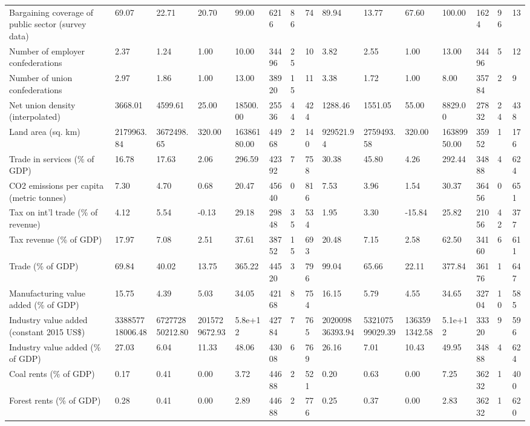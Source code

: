 \begin{longtable}{lllllllllllllll}
\addlinespace
Bargaining coverage of public sector (survey data) & 69.07 & 22.71 & 20.70 & 99.00 & 6216 & 86 & 74 & 89.94 & 13.77 & 67.60 & 100.00 & 1624 & 96 & 13\\
Number of employer confederations & 2.37 & 1.24 & 1.00 & 10.00 & 34496 & 25 & 10 & 3.82 & 2.55 & 1.00 & 13.00 & 34496 & 5 & 12\\
Number of union confederations & 2.97 & 1.86 & 1.00 & 13.00 & 38920 & 15 & 11 & 3.38 & 1.72 & 1.00 & 8.00 & 35784 & 2 & 9\\
Net union density (interpolated) & 3668.01 & 4599.61 & 25.00 & 18500.00 & 25536 & 44 & 424 & 1288.46 & 1551.05 & 55.00 & 8829.00 & 27832 & 24 & 438\\
Land area (sq. km) & 2179963.84 & 3672498.65 & 320.00 & 16386180.00 & 44968 & 2 & 140 & 929521.94 & 2759493.58 & 320.00 & 16389950.00 & 35952 & 1 & 176\\
\addlinespace
Trade in services (\% of GDP) & 16.78 & 17.63 & 2.06 & 296.59 & 42392 & 7 & 758 & 30.38 & 45.80 & 4.26 & 292.44 & 34888 & 4 & 624\\
CO2 emissions per capita (metric tonnes) & 7.30 & 4.70 & 0.68 & 20.47 & 45640 & 0 & 816 & 7.53 & 3.96 & 1.54 & 30.37 & 36456 & 0 & 651\\
Tax on int'l trade (\% of revenue) & 4.12 & 5.54 & -0.13 & 29.18 & 29848 & 35 & 534 & 1.95 & 3.30 & -15.84 & 25.82 & 21056 & 42 & 377\\
Tax revenue (\% of GDP) & 17.97 & 7.08 & 2.51 & 37.61 & 38752 & 15 & 693 & 20.48 & 7.15 & 2.58 & 62.50 & 34160 & 6 & 611\\
Trade (\% of GDP) & 69.84 & 40.02 & 13.75 & 365.22 & 44520 & 3 & 796 & 99.04 & 65.66 & 22.11 & 377.84 & 36176 & 1 & 647\\
\addlinespace
Manufacturing value added (\% of GDP) & 15.75 & 4.39 & 5.03 & 34.05 & 42168 & 8 & 754 & 16.15 & 5.79 & 4.55 & 34.65 & 32704 & 10 & 585\\
Industry value added (constant 2015 US\$) & 338857718006.48 & 672772850212.80 & 2015729672.93 & 5.8e+12 & 42784 & 7 & 765 & 202009836393.94 & 532107599029.39 & 1363591342.58 & 5.1e+12 & 33320 & 9 & 596\\
Industry value added (\% of GDP) & 27.03 & 6.04 & 11.33 & 48.06 & 43008 & 6 & 769 & 26.16 & 7.01 & 10.43 & 49.95 & 34888 & 4 & 624\\
Coal rents (\% of GDP) & 0.17 & 0.41 & 0.00 & 3.72 & 44688 & 2 & 521 & 0.20 & 0.63 & 0.00 & 7.25 & 36232 & 1 & 400\\
Forest rents (\% of GDP) & 0.28 & 0.41 & 0.00 & 2.89 & 44688 & 2 & 776 & 0.25 & 0.37 & 0.00 & 2.83 & 36232 & 1 & 620\\

\end{longtable}

